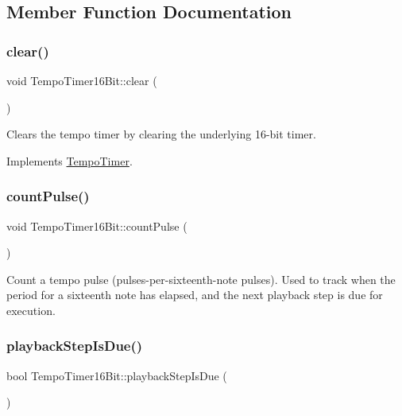 \subsection{Member Function Documentation}
\mbox{\label{class_tempo_timer16_bit_a749e01b62ff3ff184c62a99db70588ba}} 
\subsubsection{\texorpdfstring{clear()}{clear()}}
{\footnotesize\ttfamily void Tempo\+Timer16\+Bit\+::clear (\begin{DoxyParamCaption}{ }\end{DoxyParamCaption})\hspace{0.3cm}{\ttfamily [virtual]}}

Clears the tempo timer by clearing the underlying 16-\/bit timer. 

Implements \mbox{\hyperlink{class_tempo_timer}{Tempo\+Timer}}.

\mbox{\label{class_tempo_timer16_bit_a1dcf447b3ffdeadfc65f8bd3da24c632}} 
\subsubsection{\texorpdfstring{countPulse()}{countPulse()}}
{\footnotesize\ttfamily void Tempo\+Timer16\+Bit\+::count\+Pulse (\begin{DoxyParamCaption}{ }\end{DoxyParamCaption})}

Count a tempo pulse (pulses-\/per-\/sixteenth-\/note pulses). Used to track when the period for a sixteenth note has elapsed, and the next playback step is due for execution. \mbox{\label{class_tempo_timer16_bit_a480d726dc86d7136904056ac4b37082b}} 
\subsubsection{\texorpdfstring{playbackStepIsDue()}{playbackStepIsDue()}}
{\footnotesize\ttfamily bool Tempo\+Timer16\+Bit\+::playback\+Step\+Is\+Due (\begin{DoxyParamCaption}{ }\end{DoxyParamCaption})\hspace{0.3cm}{\ttfamily [virtual]}}


